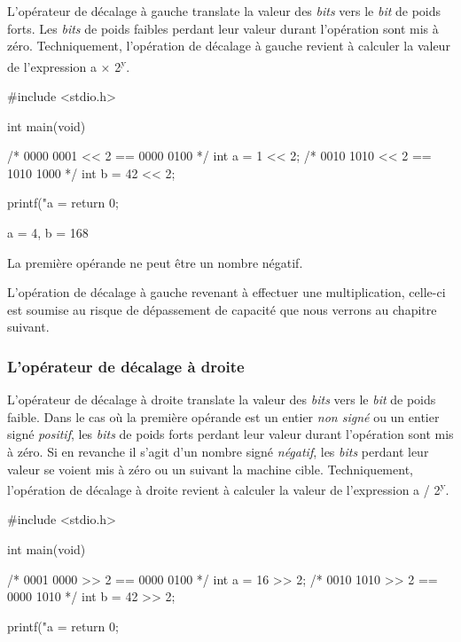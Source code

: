 L'opérateur de décalage à gauche translate la valeur des \emph{bits}
vers le \emph{bit} de poids forts. Les \emph{bits} de poids faibles
perdant leur valeur durant l'opération sont mis à zéro. Techniquement,
l'opération de décalage à gauche revient à calculer la valeur de
l'expression a × 2\textsuperscript{y}.

\begin{C}
#include <stdio.h>


int
main(void)
{
    /* 0000 0001 << 2 == 0000 0100 */
    int a = 1 << 2;
    /* 0010 1010 << 2 == 1010 1000 */
    int b = 42 << 2;

    printf("a = %
    return 0;
}
\end{C}

\begin{C}
a = 4, b = 168
\end{C}

\begin{erreurbox}
  La première opérande ne peut être un
nombre négatif.
\end{erreurbox}


\begin{attentionbox}
  L'opération de décalage à gauche
revenant à effectuer une multiplication, celle-ci est soumise au risque
de dépassement de capacité que nous verrons au chapitre suivant.
\end{attentionbox}


\subsubsection{L'opérateur de décalage à droite}
\label{loperateur-de-decalage-a-droite}

L'opérateur de décalage à droite translate la valeur des \emph{bits}
vers le \emph{bit} de poids faible. Dans le cas où la première opérande
est un entier \emph{non signé} ou un entier signé \emph{positif}, les
\emph{bits} de poids forts perdant leur valeur durant l'opération sont
mis à zéro. Si en revanche il s'agit d'un nombre signé \emph{négatif},
les \emph{bits} perdant leur valeur se voient mis à zéro ou un suivant
la machine cible. Techniquement, l'opération de décalage à droite
revient à calculer la valeur de l'expression a / 2\textsuperscript{y}.

\begin{C}
#include <stdio.h>


int
main(void)
{
    /* 0001 0000 >> 2 == 0000 0100 */
    int a = 16 >> 2;
    /* 0010 1010 >> 2 == 0000 1010 */
    int b = 42 >> 2;

    printf("a = %
    return 0;
}
\end{C}

